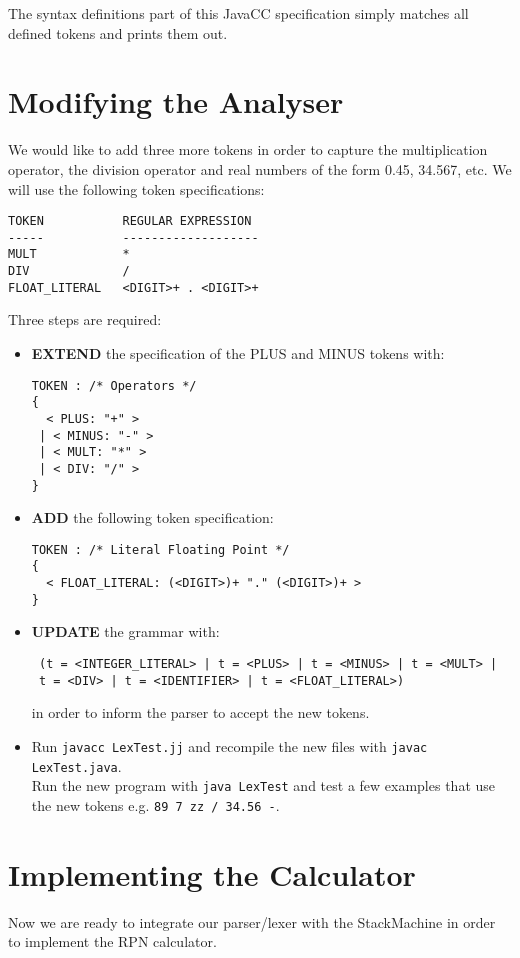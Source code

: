 \documentclass{article}
\begin{document}
The syntax definitions part of this JavaCC specification simply matches all defined tokens and prints them out. 

\section*{Modifying the Analyser}

We would like to add three more tokens in order to capture the multiplication operator, the division operator and real numbers of the form 0.45, 34.567, etc. We will use the following token specifications:
\begin{verbatim}
TOKEN           REGULAR EXPRESSION
-----           -------------------
MULT            *
DIV             /
FLOAT_LITERAL   <DIGIT>+ . <DIGIT>+ 
\end{verbatim}
Three steps are required:
\begin{itemize}
\item \textbf{EXTEND} the specification of the PLUS and MINUS tokens with:
\begin{verbatim}
TOKEN : /* Operators */
{ 
  < PLUS: "+" > 
 | < MINUS: "-" >
 | < MULT: "*" >
 | < DIV: "/" >
}
\end{verbatim}
\item \textbf{ADD} the following token specification:
\begin{verbatim}
TOKEN : /* Literal Floating Point */
{
  < FLOAT_LITERAL: (<DIGIT>)+ "." (<DIGIT>)+ >
}
\end{verbatim}
\item \textbf{UPDATE} the grammar with:
\begin{verbatim}
 (t = <INTEGER_LITERAL> | t = <PLUS> | t = <MINUS> | t = <MULT> |
 t = <DIV> | t = <IDENTIFIER> | t = <FLOAT_LITERAL>)
\end{verbatim}
in order to inform the parser to accept the new tokens.
\item Run \verb+javacc LexTest.jj+ and recompile the new files with \verb+javac LexTest.java+.\\
Run the new program with \verb+java LexTest+ and test a few examples that use the new tokens e.g. \verb+89 7 zz / 34.56 -+.
\end{itemize}


\section*{Implementing the Calculator}

Now we are ready to integrate our parser/lexer with the StackMachine in order to implement the RPN calculator.
\end{document}
